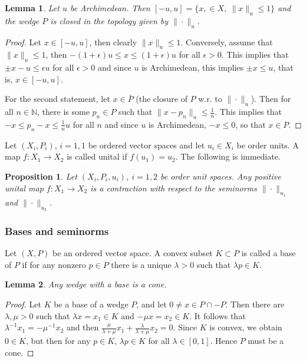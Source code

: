 \documentclass[12pt]{article}
\newtheorem{lemma}{Lemma}
\newtheorem{prop}{Proposition}
\theoremstyle{remark}
\newcommand{\<}{\langle}
\begin{document}
\begin{lemma} Let $u$ be Archimedean. Then $[-u,u]=\{x,\in X,\ \|x\|_u\le 1\}$ and the wedge $P$ is closed in the topology given by $\|\cdot\|_u$.

\end{lemma}

\begin{proof} Let $x\in [-u,u]$, then clearly $\|x\|_u\le 1$. Conversely, assume that $\|x\|_u\le 1$, then $-(1+\epsilon) u\le x\le (1+\epsilon) u$ for all $\epsilon>0$. 
This implies that $\pm x-u\le \epsilon u$ for all $\epsilon>0$ and since $u$ is Archimedean, this implies $\pm x\le u$, that is, $x\in [-u,u]$.

For the second statement, let $x\in \bar P$ (the closure of $P$ w.r. to $\|\cdot\|_u$). Then for all $n\in \mathbb N$, there is some $p_n\in P$ such that $\|x-p_n\|_u\le \tfrac1n$. This implies that $-x\le p_n-x\le \tfrac 1n u$ for all $n$ and since  $u$ is Archimedean, $-x\le 0$, so that $x\in P$.

\end{proof}

Let $(X_i,P_i)$, $i=1,1$ be ordered vector spaces and let $u_i\in X_i$ be order units. A map $f:X_1\to X_2$ is called unital if $f(u_1)=u_2$. The following is immediate.

\begin{prop} Let $(X_i,P_i,u_i)$, $i=1,2$ be order unit spaces. Any positive unital map $f:X_1\to X_2$ is a contraction with respect to the seminorms $\|\cdot\|_{u_1}$ and 
$\|\cdot\|_{u_2}$.
\end{prop}



\subsubsection*{Bases and seminorms}

Let $(X,P)$ be an ordered vector space. A convex subset $K\subset P$ is called a base of $P$ if for any nonzero $p\in P$ there is a unique $\lambda>0$  such that 
$\lambda p\in K$.  

\begin{lemma} Any wedge with a base is a cone.

\end{lemma}

\begin{proof} Let $K$ be a base of a wedge $P$, and let $0\neq x\in P\cap -P$. Then there are $\lambda,\mu >0$ such that $\lambda x=x_1\in K$ and $-\mu x=x_2\in K$.  
It follows that $\lambda^{-1}x_1=-\mu^{-1}x_2$ and then  $\tfrac{\mu}{\lambda+\mu}x_1+\tfrac{\lambda}{\lambda+\mu}x_2=0$. Since $K$ is convex, we obtain $0\in K$, but then 
 for any $p\in K$,  $\lambda p\in K$ for all $\lambda\in[0,1]$. Hence $P$ must be a cone. 

\end{proof}
\end{document}
